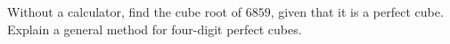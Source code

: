 Without a calculator, find the cube root of $6859$, given that it is a perfect cube. Explain a general method for four-digit perfect cubes.
